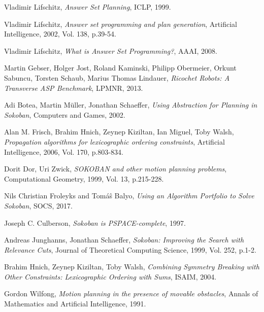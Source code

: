 \documentclass{report}
\begin{document}
\begin{thebibliography}{}
Vladimir Lifschitz,
\textit{Answer Set Planning},
ICLP, 1999.

Vladimir Lifschitz,
\textit{Answer set programming and plan generation},
Artificial Intelligence, 2002, Vol. 138, p.39-54.

Vladimir Lifschitz,
\textit{What is Answer Set Programming?},
AAAI, 2008.

Martin Gebser, Holger Jost, Roland Kaminski, Philipp Obermeier, Orkunt Sabuncu, Torsten Schaub, Marius Thomas Lindauer,
\textit{Ricochet Robots: A Transverse ASP Benchmark},
LPMNR, 2013.

Adi Botea, Martin Müller, Jonathan Schaeffer,
\textit{Using Abstraction for Planning in Sokoban},
Computers and Games, 2002.

Alan M. Frisch, Brahim Hnich, Zeynep Kiziltan, Ian Miguel, Toby Walsh,
\textit{Propagation algorithms for lexicographic ordering constraints},
Artificial Intelligence, 2006, Vol. 170, p.803-834.

Dorit Dor, Uri Zwick,
\textit{SOKOBAN and other motion planning problems},
Computational Geometry, 1999, Vol. 13, p.215-228.

Nils Christian Froleyks and Tom{\'a}{\^s} Balyo,
\textit{Using an Algorithm Portfolio to Solve Sokoban},
SOCS, 2017.

Joseph C. Culberson,
\textit{Sokoban is PSPACE-complete},
1997.

Andreas Junghanns, Jonathan Schaeffer,
\textit{Sokoban: Improving the Search with Relevance Cuts},
Journal of Theoretical Computing Science, 1999, Vol. 252, p.1-2.

Brahim Hnich, Zeynep Kiziltan, Toby Walsh,
\textit{Combining Symmetry Breaking with Other Constraints: Lexicographic Ordering with Sums},
ISAIM, 2004.

Gordon Wilfong,
\textit{Motion planning in the presence of movable obstacles},
Annals of Mathematics and Artificial Intelligence, 1991.
\end{thebibliography}
\end{document}
